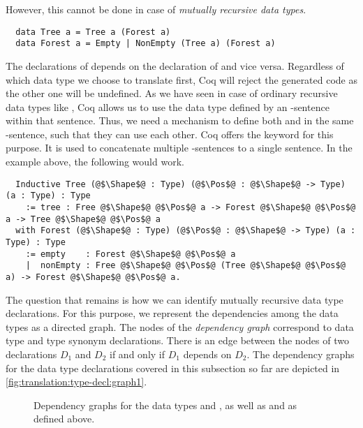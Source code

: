 However, this cannot be done in case of \textit{mutually recursive data types}.
\begin{verbatim}
  data Tree a = Tree a (Forest a)
  data Forest a = Empty | NonEmpty (Tree a) (Forest a)
\end{verbatim}
The declarations of  depends on the declaration of  and vice versa.
Regardless of which data type we choose to translate first, Coq will reject the generated code as the other one will be undefined.
As we have seen in case of ordinary recursive data types like , Coq allows us to use the data type defined by an -sentence within that sentence.
Thus, we need a mechanism to define both  and  in the same -sentence, such that they can use each other.
Coq offers the  keyword for this purpose.
It is used to concatenate multiple -sentences to a single sentence.
In the example above, the following would work.
\begin{verbatim}
  Inductive Tree (@$\Shape$@ : Type) (@$\Pos$@ : @$\Shape$@ -> Type) (a : Type) : Type
    := tree : Free @$\Shape$@ @$\Pos$@ a -> Forest @$\Shape$@ @$\Pos$@ a -> Tree @$\Shape$@ @$\Pos$@ a
  with Forest (@$\Shape$@ : Type) (@$\Pos$@ : @$\Shape$@ -> Type) (a : Type) : Type
    := empty    : Forest @$\Shape$@ @$\Pos$@ a
    |  nonEmpty : Free @$\Shape$@ @$\Pos$@ (Tree @$\Shape$@ @$\Pos$@ a) -> Forest @$\Shape$@ @$\Pos$@ a.
\end{verbatim}

The question that remains is how we can identify mutually recursive data type declarations.
For this purpose, we represent the dependencies among the data types as a directed graph.
The nodes of the \textit{dependency graph} correspond to data type and type synonym declarations.
There is an edge between the nodes of two declarations $D_1$ and $D_2$ if and only if $D_1$ depends on $D_2$.
The dependency graphs for the data type declarations covered in this subsection so far are depicted in \autoref{fig:translation:type-decl:graph1}.

\begin{figure}[H]
  \caption{Dependency graphs for the data types  and ,  as well as  and  as defined above.}
  \label{fig:translation:type-decl:graph1}
\end{figure}

